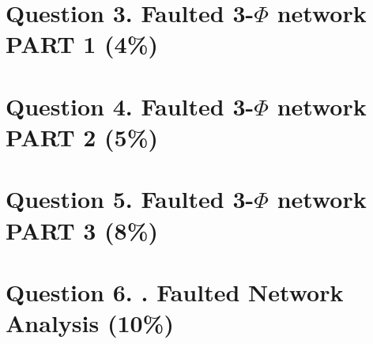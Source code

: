 \documentclass[12pt]{report} %
\begin{document}
\section{Question 3. Faulted 3-$\Phi$ network PART 1 (4\%)} 
\newpage



\section{Question 4. Faulted 3-$\Phi$ network PART 2 (5\%)} 
\newpage



\section{Question 5. Faulted 3-$\Phi$ network PART 3 (8\%)} 
\newpage



\section{Question 6. . Faulted Network Analysis (10\%)} 
\newpage

\printbibliography[title = {References}]
\end{document}
